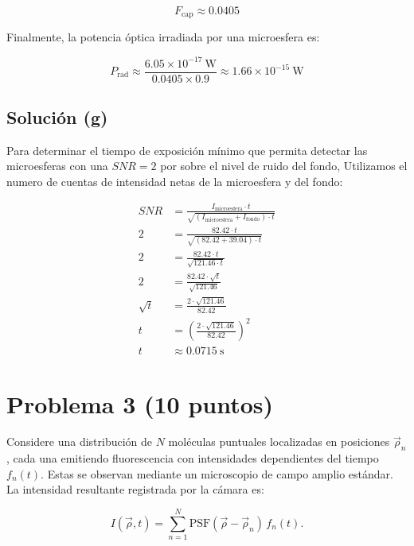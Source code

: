 \documentclass[11pt]{article}
\begin{document}
\begin{equation*}
    F_{\text{cap}} \approx 0.0405
\end{equation*}

Finalmente, la potencia óptica irradiada por una microesfera es:

\begin{equation*}
    P_{\text{rad}} \approx \frac{6.05 \times 10^{-17}\ \text{W}}{0.0405 \times 0.9} \approx 1.66 \times 10^{-15}\ \text{W}
\end{equation*}

\subsection*{Solución (g)}

Para determinar el tiempo de exposición mínimo que permita detectar las microesferas con una $SNR = 2$ por sobre el nivel de ruido del fondo, Utilizamos el numero de cuentas de intensidad netas de la microesfera y del fondo:

\begin{align*}
    SNR &= \frac{I_{\text{microesfera}} \cdot t}{\sqrt{(I_{\text{microesfera}} + I_{\text{fondo}}) \cdot t}} \\
    2 &= \frac{82.42 \cdot t}{\sqrt{(82.42 + 39.04) \cdot t}} \\
    2 &= \frac{82.42 \cdot t}{\sqrt{121.46 \cdot t}} \\
    2 &= \frac{82.42 \cdot \sqrt{t}}{\sqrt{121.46}} \\
    \sqrt{t} &= \frac{2 \cdot \sqrt{121.46}}{82.42} \\
    t &= \left(\frac{2 \cdot \sqrt{121.46}}{82.42}\right)^2 \\
    t &\approx 0.0715\ \text{s}
\end{align*}


\section*{Problema 3 (10 puntos)}

Considere una distribución de $N$ moléculas puntuales localizadas en posiciones $\vec{\rho}_n$, 
cada una emitiendo fluorescencia con intensidades dependientes del tiempo $f_n(t)$. 
Estas se observan mediante un microscopio de campo amplio estándar. 
La intensidad resultante registrada por la cámara es:

\[
I(\vec{\rho}, t) = \sum_{n=1}^{N} \text{PSF}(\vec{\rho} - \vec{\rho}_n)\, f_n(t).
\]
\end{document}
